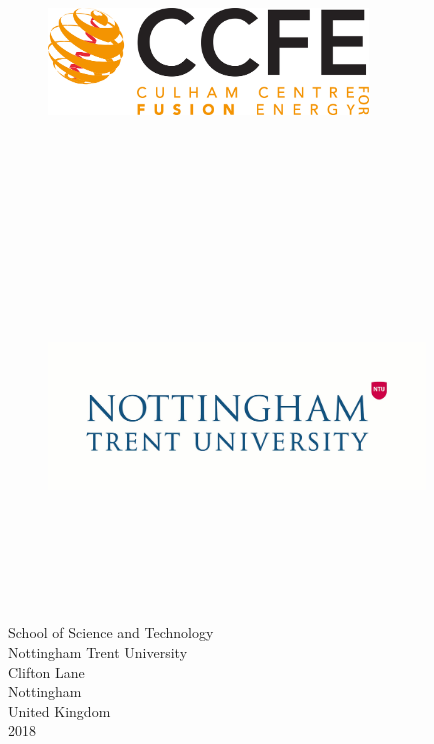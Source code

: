 \documentclass[12pt,a4paper,oneside]{report}
\begin{document}
\begin{titlepage}
\begin{figure}[H]
\centering
\includegraphics[width=8.5cm, height=8.5cm, keepaspectratio]{Images/CCFElogo.jpg}
\includegraphics[width=10cm, height=10cm, keepaspectratio]{Images/ntulogo.jpg}
\end{figure}    

\large{School of Science and Technology} \\
\large{Nottingham Trent University} \\
\large{Clifton Lane} \\
\large{Nottingham} \\
\large{United Kingdom} \\
\vspace{1cm}
\large{2018}
\end{titlepage}


\tableofcontents
\listoffigures
\listoftables
\pagebreak
\clearpage
{}
\end{document}
